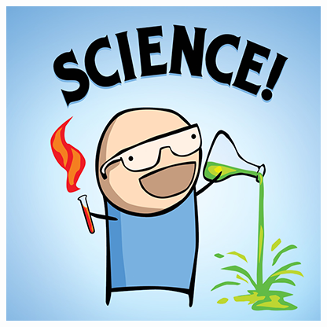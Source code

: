 \begin{frame}
\begin{figure}
\begin{minipage}{.5\textwidth}
                    \includegraphics[width=0.85\linewidth]{figures/science.png}
                \end{minipage}
            \end{figure}
\end{frame}